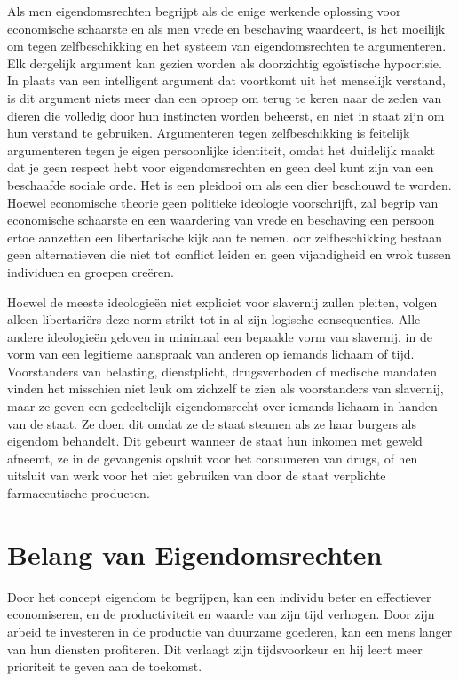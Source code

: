 Als men eigendomsrechten begrijpt als de enige werkende oplossing voor economische schaarste en als men vrede en beschaving waardeert, is het moeilijk om tegen zelfbeschikking en het systeem van eigendomsrechten te argumenteren. Elk dergelijk argument kan gezien worden als doorzichtig egoïstische hypocrisie. In plaats van een intelligent argument dat voortkomt uit het menselijk verstand, is dit argument niets meer dan een oproep om terug te keren naar de zeden van dieren die volledig door hun instincten worden beheerst, en niet in staat zijn om hun verstand te gebruiken. Argumenteren tegen zelfbeschikking is feitelijk argumenteren tegen je eigen persoonlijke identiteit, omdat het duidelijk maakt dat je geen respect hebt voor eigendomsrechten en geen deel kunt zijn van een beschaafde sociale orde. Het is een pleidooi om als een dier beschouwd te worden. Hoewel economische theorie geen politieke ideologie voorschrijft, zal begrip van economische schaarste en een waardering van vrede en beschaving een persoon ertoe aanzetten een libertarische kijk aan te nemen. oor zelfbeschikking bestaan geen alternatieven die niet tot conflict leiden en geen vijandigheid en wrok tussen individuen en groepen creëren.

Hoewel de meeste ideologieën niet expliciet voor slavernij zullen pleiten, volgen alleen libertariërs deze norm strikt tot in al zijn logische consequenties. Alle andere ideologieën geloven in minimaal een bepaalde vorm van slavernij, in de vorm van een legitieme aanspraak van anderen op iemands lichaam of tijd. Voorstanders van belasting, dienstplicht, drugsverboden of medische mandaten vinden het misschien niet leuk om zichzelf te zien als voorstanders van slavernij, maar ze geven een gedeeltelijk eigendomsrecht over iemands lichaam in handen van de staat. Ze doen dit omdat ze de staat steunen als ze haar burgers als eigendom behandelt. Dit gebeurt wanneer de staat hun inkomen met geweld afneemt, ze in de gevangenis opsluit voor het consumeren van drugs, of hen uitsluit van werk voor het niet gebruiken van door de staat verplichte farmaceutische producten.\autocite{54}

\section{Belang van Eigendomsrechten}

Door het concept eigendom te begrijpen, kan een individu beter en effectiever economiseren, en de productiviteit en waarde van zijn tijd verhogen. Door zijn arbeid te investeren in de productie van duurzame goederen, kan een mens langer van hun diensten profiteren. Dit verlaagt zijn tijdsvoorkeur en hij leert meer prioriteit te geven aan de toekomst.

